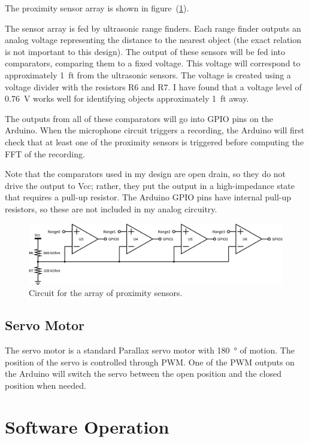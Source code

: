 \documentclass[11pt]{article}           %
\begin{document}
The proximity sensor array is shown in figure~(\ref{fig:rangefinders}).

The sensor array is fed by ultrasonic range finders. Each range finder outputs
an analog voltage representing the distance to the nearest object (the exact
relation is not important to this design). The output of these sensors will be
fed into comparators, comparing them to a fixed voltage. This voltage will
correspond to approximately \SI{1}{ft} from the ultrasonic sensors. The voltage
is created using a voltage divider with the resistors R6 and R7. I have found
that a voltage level of \SI{0.76}{\volt} works well for identifying objects
approximately \SI{1}{ft} away.

The outputs from all of these comparators will go into GPIO pins on the Arduino.
When the microphone circuit triggers a recording, the Arduino will first check
that at least one of the proximity sensors is triggered before computing the
FFT of the recording.

Note that the comparators used in my design are open drain, so they do not drive
the output to Vcc; rather, they put the output in a high-impedance state that
requires a pull-up resistor. The Arduino GPIO pins have internal pull-up
resistors, so these are not included in my analog circuitry.

\begin{figure}[h]
    \centering
    \includegraphics[width=1.0\linewidth]{sch/rangefinders.png}
    \caption{Circuit for the array of proximity sensors.}
\label{fig:rangefinders}
\end{figure}

\subsection{Servo Motor}
\label{sub:servo_motor}

The servo motor is a standard Parallax servo motor with \SI{180}{\degree} of
motion. The position of the servo is controlled through PWM\@. One of the PWM
outputs on the Arduino will switch the servo between the open position and the
closed position when needed.

\section{Software Operation}
\label{sec:source_code_listing}
\end{document}
